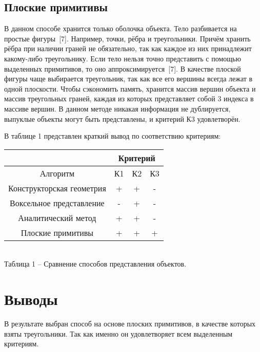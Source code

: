 {    \subsection{Плоские примитивы} {
        В данном способе хранится только оболочка объекта.
        Тело разбивается на простые фигуры~[7].
        Например, точки, рёбра и треугольники.
        Причём хранить рёбра при наличии граней не обязательно, так как
        каждое из них принадлежит какому-либо треугольнику.
        Если тело нельзя точно представить с помощью выделенных примитивов,
        то оно аппроксимируется~[7].
        В качестве плоской фигуры чаще выбирается треугольник, так как все его вершины всегда лежат в одной плоскости.
        Чтобы сэкономить память, хранится массив вершин объекта и массив треугольных граней, каждая из которых представляет собой 3 индекса в массиве вершин.
        В данном методе никакая информация не дублируется, выпуклые объекты могут
        быть представлены, и критерий К3 удовлетворён.
    }

    В таблице 1 представлен краткий вывод по соответствию критериям: \\
    \begin{center}
        \begin{tabular} { |c|c|c|c| }
            \hline
            \hspace{0pt} & \multicolumn{3}{|c|}{Критерий} \\
            \hline
            Алгоритм & К1 & К2 & К3 \\
            \hline
            Конструкторская геометрия & + & + & - \\
            \hline
            Воксельное представление & - & + & - \\
            \hline
            Аналитический метод & + & + & - \\
            \hline
            Плоские примитивы & + & + & + \\
            \hline
        \end{tabular} \\
        \vspace{2mm}
        \small { Таблица 1 -- Сравнение способов представления объектов. }
    \end{center}

    \section*{Выводы} {
        В результате выбран способ на основе плоских примитивов,
        в качестве которых взяты треугольники.
        Так как именно он удовлетворяет всем выделенным критериям.
    }
}